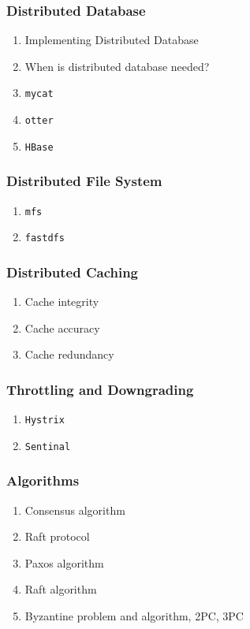 \documentclass[11pt, twocolumn]{article}
\begin{document}
\subsubsection{Distributed Database}
\begin{enumerate}
	\item Implementing Distributed Database
	\item When is distributed database needed?
	\item \texttt{mycat}
	\item \texttt{otter}
	\item \texttt{HBase}
\end{enumerate}

\subsubsection{Distributed File System}
\begin{enumerate}
	\item \texttt{mfs}
	\item \texttt{fastdfs}
\end{enumerate}

\subsubsection{Distributed Caching}
\begin{enumerate}
	\item Cache integrity
	\item Cache accuracy
	\item Cache redundancy
\end{enumerate}

\subsubsection{Throttling and Downgrading}
\begin{enumerate}
	\item \texttt{Hystrix}
	\item \texttt{Sentinal}
\end{enumerate}

\subsubsection{Algorithms}
\begin{enumerate}
	\item Consensus algorithm
	\item Raft protocol
	\item Paxos algorithm
	\item Raft algorithm
	\item Byzantine problem and algorithm, 2PC, 3PC
\end{enumerate}
\end{document}
